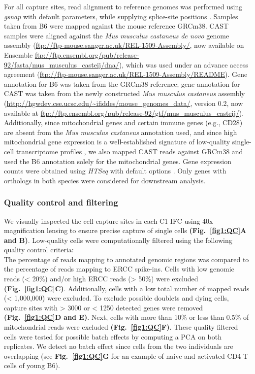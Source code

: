 For all capture sites, read alignment to reference genomes was performed using \emph{gsnap} with default parameters, while supplying splice-site positions \citep{Wu2010a}. Samples taken from B6 were mapped against the mouse reference GRCm38. CAST samples were aligned against the \emph{Mus musculus castaneus de novo} genome assembly (\url{ftp://ftp-mouse.sanger.ac.uk/REL-1509-Assembly/}, now available on Ensemble \url{ftp://ftp.ensembl.org/pub/release-92/fasta/mus_musculus_casteij/dna/}), which was used under an advance access agreement (\url{ftp://ftp-mouse.sanger.ac.uk/REL-1509-Assembly/README}). Gene annotation for B6 was taken from the GRCm38 reference; gene annotation for CAST was taken from the newly constructed \emph{Mus musculus castaneus} assembly (\url{http://hgwdev.cse.ucsc.edu/~ifiddes/mouse_genomes_data/}, version 0.2, now available at \url{ftp://ftp.ensembl.org/pub/release-92/gtf/mus_musculus_casteij/}). Additionally, since mitochondrial genes and certain immune genes (e.g., CD28) are absent from the \emph{Mus musculus castaneus} annotation used, and since high mitochondrial gene expression is a well-established signature of low-quality single-cell transcriptome profiles \citep{Ilicic2016}, we also mapped CAST reads against GRCm38 and used the B6 annotation solely for the mitochondrial genes. Gene expression counts were obtained using \emph{HTSeq} with default options \citep{Anders2014}. Only genes with orthologs in both species were considered for downstream analysis. 

\subsubsection{Quality control and filtering}

We visually inspected the cell-capture sites in each C1 IFC using 40x magnification lensing to ensure precise capture of single cells \textbf{(Fig.~\ref{fig1:QC}A and B)}. Low-quality cells were computationally filtered using the following quality control criteria:\\
The percentage of reads mapping to annotated genomic regions was compared to the percentage of reads mapping to ERCC spike-ins. Cells with low genomic reads (< 20\%) and/or high ERCC reads (> 50\%) were excluded \textbf{(Fig.~\ref{fig1:QC}C)}. Additionally, cells with  a low total number of mapped reads (< 1,000,000) were excluded. To exclude possible doublets and dying cells, capture sites with > 3000 or < 1250 detected genes were removed \textbf{(Fig.~\ref{fig1:QC}D and E)}. Next, cells with more than 10\% or less than 0.5\% of mitochondrial reads were excluded \textbf{(Fig.~\ref{fig1:QC}F)}. These quality filtered cells were tested for possible batch effects by computing a PCA on both replicates. We detect no batch effect since cells from the two individuals are overlapping (see \textbf{Fig.~\ref{fig1:QC}G} for an example of naive and activated CD4\plus{} T cells of young B6).\\

